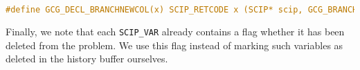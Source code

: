 \begin{lstlisting}[language=C, caption=Branching Rule Interface Extension]
#define GCG_DECL_BRANCHNEWCOL(x) SCIP_RETCODE x (SCIP* scip, GCG_BRANCHDATA* branchdata, SCIP_VAR* mastervar)
\end{lstlisting}

Finally, we note that each \texttt{SCIP\_VAR} already contains a flag whether it has been deleted from the problem. We use this flag instead of marking such variables as deleted in the history buffer ourselves.
